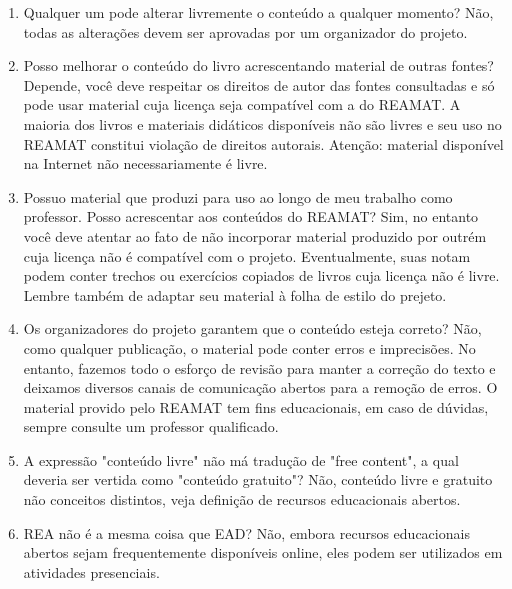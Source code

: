 \documentclass[12pt]{report}
\begin{document}
\begin{enumerate}
\item Qualquer um pode alterar livremente o conteúdo a qualquer momento? 
Não, todas as alterações devem ser aprovadas por um organizador do projeto. 

\item Posso melhorar o conteúdo do livro acrescentando material de outras fontes? 
Depende, você deve respeitar os direitos de autor das fontes consultadas e só pode usar material cuja licença seja compatível com a do REAMAT. A maioria dos livros e materiais didáticos disponíveis não são livres e seu uso no REAMAT constitui violação de direitos autorais. Atenção: material disponível na Internet não necessariamente é livre.  

\item Possuo material que produzi para uso ao longo de meu trabalho como professor. Posso acrescentar aos conteúdos do REAMAT? 
Sim, no entanto você deve atentar ao fato de não incorporar material produzido por outrém cuja licença não é compatível com o projeto. Eventualmente, suas notam podem conter trechos ou exercícios copiados de livros cuja licença não é livre. Lembre também de adaptar seu material à folha de estilo do prejeto. 

\item Os organizadores do projeto garantem que o conteúdo esteja correto? 
Não, como qualquer publicação, o material pode conter erros e imprecisões. No entanto, fazemos todo o esforço de revisão para manter a correção do texto e deixamos diversos canais de comunicação abertos para a remoção de erros. O material provido pelo REAMAT tem fins educacionais, em caso de dúvidas, sempre consulte um professor qualificado. 

\item A expressão "conteúdo livre" não má tradução de "free content", a qual deveria ser vertida como "conteúdo gratuito"? 
Não, conteúdo livre e gratuito não conceitos distintos, veja definição de recursos educacionais abertos. 

\item REA não é a mesma coisa que EAD?
Não, embora recursos educacionais abertos sejam frequentemente disponíveis online, eles podem ser utilizados em atividades presenciais.
\end{enumerate}
\end{document}
